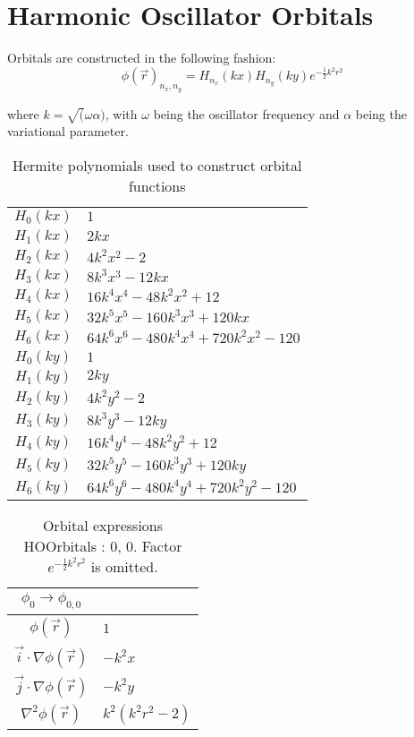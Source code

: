 \chapter{Harmonic Oscillator Orbitals}
\label{appendix:SymPyHO}

Orbitals are constructed in the following fashion:
\begin{equation*}
\phi(\vec r)_{n_x, n_y} = H_{n_x}(kx)H_{n_y}(ky)e^{-\frac{1}{2}k^2r^2}
\end{equation*}   

where $k = \sqrt(\omega\alpha)$, with $\omega$ being the oscillator frequency and $\alpha$ being the variational parameter.  



\begin{table}
\begin{center}
\begin{tabular}{c|l}
$H_{0}(kx)$ & $1$\\
$H_{1}(kx)$ & $2 k x$\\
$H_{2}(kx)$ & $4 k^{2} x^{2} -2$\\
$H_{3}(kx)$ & $8 k^{3} x^{3} - 12 k x$\\
$H_{4}(kx)$ & $16 k^{4} x^{4} - 48 k^{2} x^{2} + 12$\\
$H_{5}(kx)$ & $32 k^{5} x^{5} - 160 k^{3} x^{3} + 120 k x$\\
$H_{6}(kx)$ & $64 k^{6} x^{6} - 480 k^{4} x^{4} + 720 k^{2} x^{2} -120$\\
\hline
$H_{0}(ky)$ & $1$\\
$H_{1}(ky)$ & $2 k y$\\
$H_{2}(ky)$ & $4 k^{2} y^{2} -2$\\
$H_{3}(ky)$ & $8 k^{3} y^{3} - 12 k y$\\
$H_{4}(ky)$ & $16 k^{4} y^{4} - 48 k^{2} y^{2} + 12$\\
$H_{5}(ky)$ & $32 k^{5} y^{5} - 160 k^{3} y^{3} + 120 k y$\\
$H_{6}(ky)$ & $64 k^{6} y^{6} - 480 k^{4} y^{4} + 720 k^{2} y^{2} -120$\\
\end{tabular}
\caption{Hermite polynomials used to construct orbital functions}
\end{center}
\end{table}

\clearpage

\begin{table}
\begin{center}
\begin{tabular}{c|l}
$\phi_{0} \rightarrow \phi_{0, 0}$\\
\hline
$\phi(\vec r)$ & $1$\\
\hline
$\vec i\cdot \nabla \phi(\vec r)$ & $- k^{2} x$\\
$\vec j\cdot \nabla \phi(\vec r)$ & $- k^{2} y$\\
\hline
$\nabla^2 \phi(\vec r)$ & $k^{2} \left(k^{2} r^{2} -2\right)$\\
\end{tabular}
\caption{Orbital expressions HOOrbitals : 0, 0. Factor $e^{- \frac{1}{2} k^{2} r^{2}}$ is omitted.}
\end{center}
\end{table}


